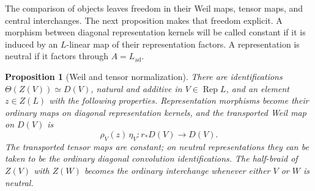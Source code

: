 \documentclass[11pt]{article}
\numberwithin{equation}{section}
\newtheorem{proposition}[theorem]{Proposition}
\theoremstyle{definition}
\theoremstyle{remark}
\newcommand{\Rep}{\operatorname{Rep}}
\begin{document}
The comparison of objects leaves freedom in their Weil maps, tensor
maps, and central interchanges.  The next proposition makes that
freedom explicit.  A morphism between diagonal representation kernels
will be called constant if it is induced by an $L$-linear map of their
representation factors.  A representation is neutral if it factors
through $A=L_{\mathrm{ad}}$.

\begin{proposition}[Weil and tensor normalization]
\label{enh:central-normalization}
There are identifications $\Theta(Z(V))\simeq D(V)$, natural and
additive in $V\in\Rep L$, and an element $z\in Z(L)$ with the
following properties.  Representation morphisms become their ordinary
maps on diagonal representation kernels, and the transported Weil map
on $D(V)$ is
\begin{equation}\label{enh:central-weil}
 \rho_V(z)\,\eta_V:r_*D(V)\longrightarrow D(V).
\end{equation}
The transported tensor maps are constant; on neutral representations
they can be taken to be the ordinary diagonal convolution
identifications.  The half-braid of $Z(V)$ with $Z(W)$ becomes the
ordinary interchange whenever either $V$ or $W$ is neutral.
\end{proposition}
\end{document}
